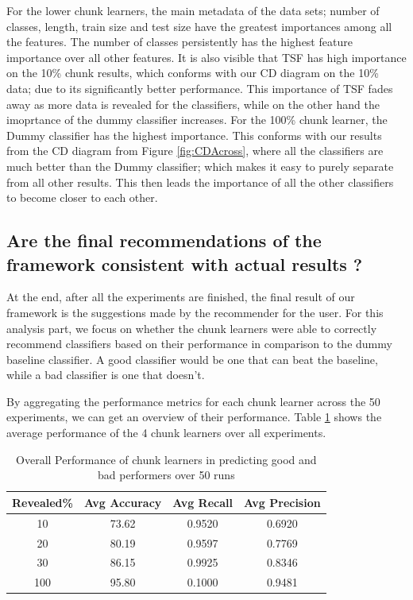 For the lower chunk learners, the main metadata of the data sets; number of classes, length, train size and test size have the greatest importances among all the features.
The number of classes persistently has the highest feature importance over all other features.
It is also visible that TSF has high importance on the 10\% chunk results, which conforms with our CD diagram on the 10\% data; due to its significantly better performance.
This importance of TSF fades away as more data is revealed for the classifiers, while on the other hand the imoprtance of the dummy classifier increases.
For the 100\% chunk learner, the Dummy classifier has the highest importance.
This conforms with our results from the CD diagram from Figure \ref{fig:CDAcross},
where all the classifiers are much better than the Dummy classifier; which makes it easy to purely separate from all other results.
This then leads the importance of all the other classifiers to become closer to each other.

\subsection{Are the final recommendations of the framework consistent with actual results ?}
\label{SubsectionFinalRecommendation}
At the end, after all the experiments are finished, the final result of our framework is the suggestions made by the recommender for the user.
For this analysis part, we focus on whether the chunk learners were able to correctly recommend classifiers based on their performance in comparison to the dummy baseline classifier.
A good classifier would be one that can beat the baseline, while a bad classifier is one that doesn't.

By aggregating the performance metrics for each chunk learner across the 50 experiments, we can get an overview of their performance.
Table \ref{TableRecommenderOverallPerf} shows the average performance of the 4 chunk learners over all experiments.

\begin{table}[!hbt]
    \centering
    \begin{tabular}{ |c|c|c|c| }
        \hline
        \textbf{Revealed\%} & \textbf{Avg Accuracy} & \textbf{Avg Recall} & \textbf{Avg Precision} \\ \hline
        10 & 73.62 & 0.9520 & 0.6920 \\ \hline
        20 & 80.19 & 0.9597 & 0.7769 \\ \hline
        30 & 86.15 & 0.9925 & 0.8346 \\ \hline
        100 & 95.80 & 0.1000 & 0.9481 \\ \hline
      \end{tabular}
      \caption{Overall Performance of chunk learners in predicting good and bad performers over 50 runs}
      \label{TableRecommenderOverallPerf}
\end{table}

